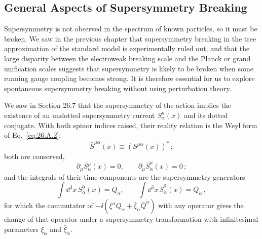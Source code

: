 
\subsection{General Aspects of Supersymmetry Breaking}

Supersymmetry is not observed in the spectrum of known particles, so it
must be broken. We saw in the previous chapter that supersymmetry breaking
in the tree approximation of the standard model is experimentally ruled
out, and that the large disparity between the electroweak breaking scale
and the Planck or grand unification scales suggests that supersymmetry is
likely to be broken when some running gauge coupling becomes strong. It is
therefore essential for us to explore spontaneous supersymmetry breaking
without using perturbation theory.

We saw in Section 26.7 that the supersymmetry of the action implies the
existence of an undotted supersymmetry current \(S^\mu_\alpha(x)\) and
its dotted conjugate. With both spinor indices raised, their reality
relation is the Weyl form of Eq.~\eqref{eq:26.A.2}:
\begin{equation}
  \bar S^{\mu\dot\alpha}(x)
  \equiv\left(S^{\mu\alpha}(x)\right)^*\,;
  \tag{29.1.1}\label{eq:29.1.1}
\end{equation}
both are conserved,
\begin{equation}
  \partial_\mu S^\mu_\alpha(x)=0,
  \qquad
  \partial_\mu\bar S^\mu_{\dot\alpha}(x)=0\,;
  \tag{29.1.2}\label{eq:29.1.2}
\end{equation}
and the integrals of their time components are the supersymmetry
generators
\begin{equation}
  \int \dd^3x\,S^0_\alpha(x)=Q_\alpha,
  \qquad
  \int \dd^3x\,\bar S^0_{\dot\alpha}(x)=\bar Q_{\dot\alpha}\,,
  \tag{29.1.3}\label{eq:29.1.3}
\end{equation}
for which the commutator of
\(-\ii(\xi^\alpha Q_\alpha+
\bar\xi_{\dot\alpha}\bar Q^{\dot\alpha})\) with any operator gives
the change of that operator under a supersymmetry transformation with
infinitesimal parameters \(\xi_\alpha\) and
\(\bar\xi_{\dot\alpha}\).

